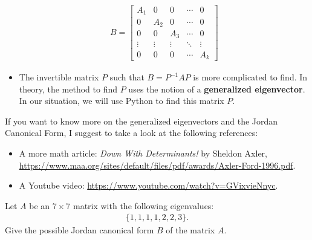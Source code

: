 \documentclass[12pt,a4paper]{article}
\newcounter{example}[section]
\begin{document}
\begin{itemize}
		\begin{align*}
		B = \begin{bmatrix}
		A_1 & 0 & 0 & \cdots & 0 \\
		0 & A_2 & 0 & \cdots & 0 \\
		0 & 0 & A_3 & \cdots & 0 \\
		\vdots & \vdots & \vdots & \ddots  & \vdots \\
		0 & 0 & 0 & \cdots & A_k
		\end{bmatrix}
		\end{align*}
	\item The invertible matrix $P$ such that $B = P^{-1} A P$ is more complicated to find. In theory, the method to find $P$ uses the notion of a \textbf{generalized eigenvector}. In our situation, we will use Python to find this matrix $P$. 
	\end{itemize}
	
	If you want to know more on the generalized eigenvectors and the Jordan Canonical Form, I suggest to take a look at the following references:
	\begin{itemize}
	\item A more math article: \textit{Down With Determinants!} by Sheldon Axler, \url{https://www.maa.org/sites/default/files/pdf/awards/Axler-Ford-1996.pdf}.
	\item A Youtube video: \url{https://www.youtube.com/watch?v=GVixvieNnyc}.
	\end{itemize}
	
	\newpage
	
	\begin{example}
	Let $A$ be an $7 \times 7$ matrix with the following eigenvalues:
		\begin{align*}
		\{ 1, 1, 1, 1, 2, 2, 3 \} .
		\end{align*}
	Give the possible Jordan canonical form $B$ of the matrix $A$.
	\end{example}
\end{document}

